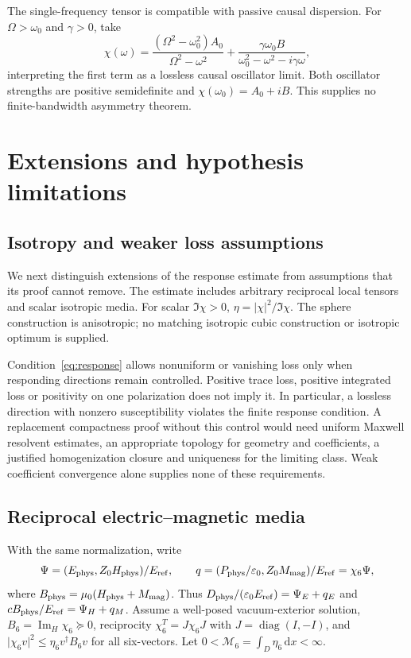 \documentclass[11pt]{article}
\newcommand{\ImH}{\operatorname{Im}_{\!H}}
\newcommand{\dd}{\,\mathrm{d}}
\newcommand{\abs}[1]{\lvert #1\rvert}
\begin{document}
The single-frequency tensor is compatible with passive causal dispersion. For $\Omega>\omega_0$ and $\gamma>0$, take
\begin{equation}\label{eq:causal}
 \chi(\omega)=\frac{(\Omega^2-\omega_0^2)A_0}{\Omega^2-\omega^2}
       +\frac{\gamma\omega_0 B}{\omega_0^2-\omega^2-i\gamma\omega},
\end{equation}
interpreting the first term as a lossless causal oscillator limit. Both oscillator strengths are positive semidefinite and $\chi(\omega_0)=A_0+iB$. This supplies no finite-bandwidth asymmetry theorem.

\section{Extensions and hypothesis limitations}\label{sec:extensions}
\subsection{Isotropy and weaker loss assumptions}
We next distinguish extensions of the response estimate from assumptions that its proof cannot remove. The estimate includes arbitrary reciprocal local tensors and scalar isotropic media. For scalar $\Im\chi>0$, $\eta=\abs\chi^2/\Im\chi$. The sphere construction is anisotropic; no matching isotropic cubic construction or isotropic optimum is supplied.

Condition~\eqref{eq:response} allows nonuniform or vanishing loss only when responding directions remain controlled. Positive trace loss, positive integrated loss or positivity on one polarization does not imply it. In particular, a lossless direction with nonzero susceptibility violates the finite response condition. A replacement compactness proof without this control would need uniform Maxwell resolvent estimates, an appropriate topology for geometry and coefficients, a justified homogenization closure and uniqueness for the limiting class. Weak coefficient convergence alone supplies none of these requirements.

\subsection{Reciprocal electric--magnetic media}
With the same normalization, write
\[
 \Psi=(E_{\rm phys},Z_0H_{\rm phys})/E_{\rm ref},\qquad
 q=(P_{\rm phys}/\varepsilon_0,Z_0M_{\rm mag})/E_{\rm ref}=\chi_6\Psi,
\]
where $B_{\rm phys}=\mu_0(H_{\rm phys}+M_{\rm mag})$. Thus $D_{\rm phys}/(\varepsilon_0E_{\rm ref})=\Psi_E+q_E$ and $cB_{\rm phys}/E_{\rm ref}=\Psi_H+q_M$. Assume a well-posed vacuum-exterior solution, $B_6=\ImH\chi_6\succeq0$, reciprocity $\chi_6^T=J\chi_6J$ with $J=\operatorname{diag}(I,-I)$, and $\abs{\chi_6v}^2\leq\eta_6v^\dagger B_6v$ for all six-vectors. Let $0<\mathcal M_6=\int_D\eta_6\dd x<\infty$.
\end{document}
